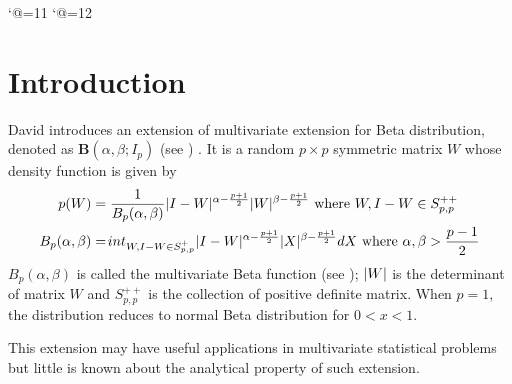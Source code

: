 \documentclass[twoside]{article}%
\DeclarePairedDelimiter\abs{\lvert}{\rvert}
\begin{document}
\newtheorem{theorem}{Theorem}[section]                                               %
\newtheorem{definition}{Definition}[section]                                         %
\newtheorem{lemma}{Lemma}[section]                                                   %
\newtheorem{proposition}{Proposition}[section]                                       %
\newtheorem{corollary}{Corollary}[section]                                           %
\newtheorem{remark}{Remark}[section]                                                 %
\renewcommand{\theequation}{\thesection.\arabic{equation}}                           %
\catcode`@=11                                                                        %
\setcounter{page}{1}                                                                 %
\thispagestyle{empty}                                                                %
\catcode`@=12                                                                        %

\section{Introduction}

David introduces an extension of
multivariate extension for Beta distribution,
denoted as $\mathbf{B}(\alpha, \beta; I_p)$ (see \cite{david1981}) .
It is a random $p\times p$  symmetric matrix $W$ whose density
function is given by
\begin{align}
p(W) &= \frac{1}{B_p(\alpha, \beta)}\abs{I-W}^{\alpha-\frac{p+1}{2}}
\abs{W}^{\beta-\frac{p+1}{2}} \textrm{ where } W, I-W \in S_{p,p}^{++}
\label{eq:distr}\\
B_p(\alpha, \beta) &= \int_{W,I-W \in S_{p,p}^{+} }\abs{I-W}^{\alpha-\frac{p+1}{2}}
\abs{X}^{\beta-\frac{p+1}{2}}dX \textrm{ where } \alpha, \beta > \frac{p-1}{2}
\end{align}
$B_p(\alpha, \beta)$ is called the multivariate Beta function (see \cite{siegel_1935}); 
$\abs{W}$ is the determinant of matrix $W$ and $S_{p,p}^{++}$ is the 
collection of positive
definite matrix.
When $p=1$, the distribution reduces to normal Beta distribution for
$0<x<1$.

This extension may have useful applications in multivariate statistical
problems but little is known about the analytical property of such extension.
\end{document}
